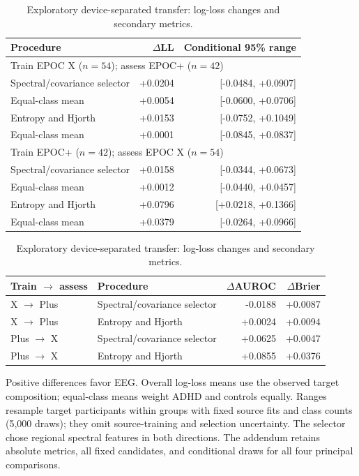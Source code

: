 \begin{table}[htbp]
\centering
\caption{Exploratory device-separated transfer: log-loss changes and secondary metrics.}
\label{tab:transfer}
\begin{tabular}{lrr}
\toprule
Procedure & $\Delta$LL & Conditional 95\% range\\
\midrule
\multicolumn{3}{l}{Train EPOC X ($n=54$); assess EPOC+ ($n=42$)}\\
Spectral/covariance selector & +0.0204 & [-0.0484, +0.0907] \\
\quad Equal-class mean & +0.0054 & [-0.0600, +0.0706] \\
Entropy and Hjorth & +0.0153 & [-0.0752, +0.1049] \\
\quad Equal-class mean & +0.0001 & [-0.0845, +0.0837] \\
\midrule
\multicolumn{3}{l}{Train EPOC+ ($n=42$); assess EPOC X ($n=54$)}\\
Spectral/covariance selector & +0.0158 & [-0.0344, +0.0673] \\
\quad Equal-class mean & +0.0012 & [-0.0440, +0.0457] \\
Entropy and Hjorth & +0.0796 & [+0.0218, +0.1366] \\
\quad Equal-class mean & +0.0379 & [-0.0264, +0.0966] \\
\bottomrule
\end{tabular}

\vspace{6pt}
\begin{tabular}{llrr}
\toprule
Train $\rightarrow$ assess & Procedure & $\Delta$AUROC & $\Delta$Brier\\
\midrule
X $\rightarrow$ Plus & Spectral/covariance selector & -0.0188 & +0.0087 \\
X $\rightarrow$ Plus & Entropy and Hjorth & +0.0024 & +0.0094 \\
Plus $\rightarrow$ X & Spectral/covariance selector & +0.0625 & +0.0047 \\
Plus $\rightarrow$ X & Entropy and Hjorth & +0.0855 & +0.0376 \\
\bottomrule
\end{tabular}
\par\smallskip
\begin{minipage}{\textwidth}\small
Positive differences favor EEG. Overall log-loss means use the observed target composition; equal-class means weight ADHD and controls equally. Ranges resample target participants within groups with fixed source fits and class counts (5,000 draws); they omit source-training and selection uncertainty. The selector chose regional spectral features in both directions. The addendum retains absolute metrics, all fixed candidates, and conditional draws for all four principal comparisons.
\end{minipage}
\end{table}
